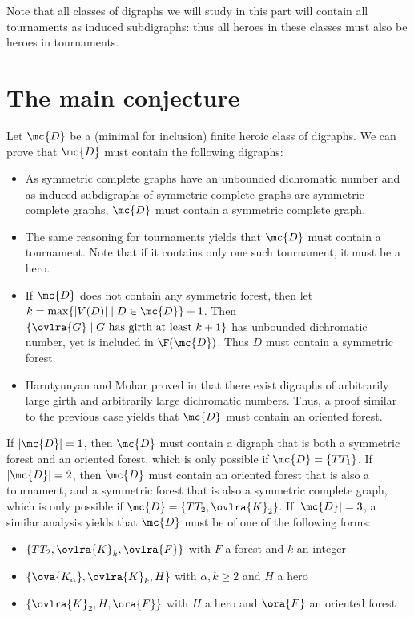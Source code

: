 Note that all classes of digraphs we will study in this part will contain all tournaments as induced subdigraphs: thus all heroes in these classes must also be heroes in tournaments.

\section{The main conjecture}

Let $\mc{D}$ be a (minimal for inclusion) finite heroic class of digraphs. We can prove that $\mc{D}$ must contain the following digraphs:
\begin{itemize}
    \item As symmetric complete graphs have an unbounded dichromatic number and as induced subdigraphs of symmetric complete graphs are symmetric complete graphs, $\mc{D}$ must contain a symmetric complete graph.
    \item The same reasoning for tournaments yields that $\mc{D}$ must contain a tournament. Note that if it contains only one such tournament, it must be a hero.
    \item If $\mc{D}$ does not contain any symmetric forest, then let $k = \max \{|V(D)| \mid D \in \mc{D}\} + 1$. Then $\{\ovlra{G} \mid G\text{ has girth at least $k+1$}\}$ has unbounded dichromatic number, yet is included in $\F(\mc{D})$. Thus $D$ must contain a symmetric forest.
    \item Harutyunyan and Mohar proved in \cite{HM12} that there exist digraphs of arbitrarily large girth and arbitrarily large dichromatic numbers. Thus, a proof similar to the previous case yields that $\mc{D}$ must contain an oriented forest.
\end{itemize}

\medskip

If $|\mc{D}| = 1$, then $\mc{D}$ must contain a digraph that is both a symmetric forest and an oriented forest, which is only possible if $\mc{D} = \{TT_1\}$. If $|\mc{D}| = 2$, then $\mc{D}$ must contain an oriented forest that is also a tournament, and a symmetric forest that is also a symmetric complete graph, which is only possible if $\mc{D} = \{TT_2, \ovlra{K}_2\}$. If $|\mc{D}| = 3$, a similar analysis yields that $\mc{D}$ must be of one of the following forms:
\begin{itemize}
    \item $\{TT_2, \ovlra{K}_k, \ovlra{F}\}$ with $F$ a forest and $k$ an integer
    \item $\{\ova{K_{\alpha}}, \ovlra{K}_k, H\}$ with $\alpha, k \geq 2$ and $H$ a hero
    \item $\{\ovlra{K}_2, H, \ora{F}\}$ with $H$ a hero and $\ora{F}$ an oriented forest
\end{itemize}

